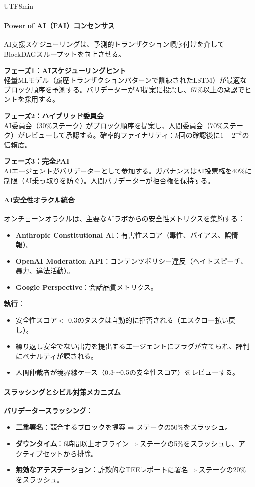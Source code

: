 \documentclass[11pt]{article}
\begin{document}
\begin{CJK}{UTF8}{min}
\paragraph{Power of AI（PAI）コンセンサス}
AI支援スケジューリングは、予測的トランザクション順序付けを介してBlockDAGスループットを向上させる。

\textbf{フェーズ1：AIスケジューリングヒント}\\
軽量MLモデル（履歴トランザクションパターンで訓練されたLSTM）が最適なブロック順序を予測する。バリデーターがAI提案に投票し、67\%以上の承認でヒントを採用する。

\textbf{フェーズ2：ハイブリッド委員会}\\
AI委員会（30\%ステーク）がブロック順序を提案し、人間委員会（70\%ステーク）がレビューして承認する。確率的ファイナリティ：$k$回の確認後に$1 - 2^{-k}$の信頼度。

\textbf{フェーズ3：完全PAI}\\
AIエージェントがバリデーターとして参加する。ガバナンスはAI投票権を40\%に制限（AI乗っ取りを防ぐ）。人間バリデーターが拒否権を保持する。

\paragraph{AI安全性オラクル統合}
オンチェーンオラクルは、主要なAIラボからの安全性メトリクスを集約する：
\begin{itemize}[noitemsep]
  \item \textbf{Anthropic Constitutional AI}：有害性スコア（毒性、バイアス、誤情報）。
  \item \textbf{OpenAI Moderation API}：コンテンツポリシー違反（ヘイトスピーチ、暴力、違法活動）。
  \item \textbf{Google Perspective}：会話品質メトリクス。
\end{itemize}

\textbf{執行}：
\begin{itemize}[noitemsep]
  \item 安全性スコア$<$ 0.3のタスクは自動的に拒否される（エスクロー払い戻し）。
  \item 繰り返し安全でない出力を提出するエージェントにフラグが立てられ、評判にペナルティが課される。
  \item 人間仲裁者が境界線ケース（0.3〜0.5の安全性スコア）をレビューする。
\end{itemize}

\paragraph{スラッシングとシビル対策メカニズム}
\textbf{バリデータースラッシング}：
\begin{itemize}[noitemsep]
  \item \textbf{二重署名}：競合するブロックを提案$\Rightarrow$ステークの50\%をスラッシュ。
  \item \textbf{ダウンタイム}：6時間以上オフライン$\Rightarrow$ステークの5\%をスラッシュし、アクティブセットから排除。
  \item \textbf{無効なアテステーション}：詐欺的なTEEレポートに署名$\Rightarrow$ステークの20\%をスラッシュ。
\end{itemize}


\end{CJK}
\end{document}
